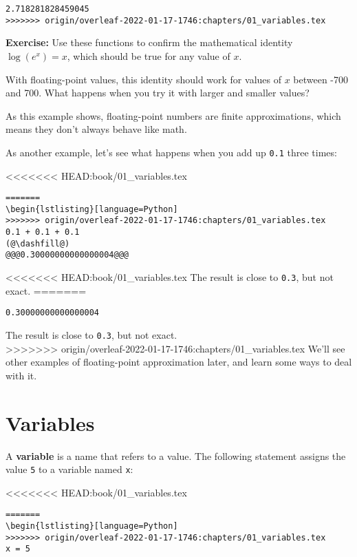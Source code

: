 \begin{lstlisting}[]
2.718281828459045
>>>>>>> origin/overleaf-2022-01-17-1746:chapters/01_variables.tex
\end{lstlisting}

\textbf{Exercise:} Use these functions to confirm the mathematical
identity \(\log(e^x) = x\), which should be true for any value of \(x\).

With floating-point values, this identity should work for values of
\(x\) between -700 and 700. What happens when you try it with larger and
smaller values?

As this example shows, floating-point numbers are finite approximations,
which means they don't always behave like math.

As another example, let's see what happens when you add up
\passthrough{\lstinline!0.1!} three times:

<<<<<<< HEAD:book/01_variables.tex
\begin{lstlisting}[]
=======
\begin{lstlisting}[language=Python]
>>>>>>> origin/overleaf-2022-01-17-1746:chapters/01_variables.tex
0.1 + 0.1 + 0.1
(@\dashfill@)
@@@0.30000000000000004@@@
\end{lstlisting}

<<<<<<< HEAD:book/01_variables.tex
The result is close to \passthrough{\lstinline!0.3!}, but not exact.
=======
\begin{lstlisting}[]
0.30000000000000004
\end{lstlisting}

The result is close to \passthrough{\lstinline!0.3!}, but not exact.\\
>>>>>>> origin/overleaf-2022-01-17-1746:chapters/01_variables.tex
We'll see other examples of floating-point approximation later, and
learn some ways to deal with it.

\hypertarget{variables}{%
\section{Variables}\label{variables}}

A \textbf{variable} is a name that refers to a value. The following
statement assigns the value \passthrough{\lstinline!5!} to a variable
named \passthrough{\lstinline!x!}:

<<<<<<< HEAD:book/01_variables.tex
\begin{lstlisting}[]
=======
\begin{lstlisting}[language=Python]
>>>>>>> origin/overleaf-2022-01-17-1746:chapters/01_variables.tex
x = 5
\end{lstlisting}

